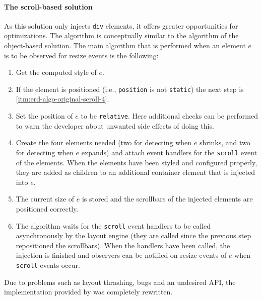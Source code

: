 \documentclass[a4paper,11pt]{kth-mag}
\newcommand{\code}[1]{\texttt{#1}}
\begin{document}
        \paragraph{The scroll-based solution}
        As this solution only injects \code{div} \glspl{element}, it offers greater opportunities for optimizations.
        The algorithm is conceptually similar to the algorithm of the object-based solution.
        The main algorithm that is performed when an element $e$ is to be observed for resize events is the following:
        \begin{enumerate}
          \item\label{itm:erd-algo-original-scroll-1} Get the computed style of $e$.
          \item\label{itm:erd-algo-original-scroll-2} If the element is positioned (i.e., \code{position} is not \code{static}) the next step is \ref{itm:erd-algo-original-scroll-4}.
          \item\label{itm:erd-algo-original-scroll-3} Set the position of $e$ to be \code{relative}. Here additional checks can be performed to warn the developer about unwanted side effects of doing this.
          \item\label{itm:erd-algo-original-scroll-4} Create the four \glspl{element} needed (two for detecting when $e$ shrinks, and two for detecting when $e$ expands) and attach event handlers for the \code{scroll} event of the \glspl{element}.
                                                      When the \glspl{element} have been styled and configured properly, they are added as children to an additional container element that is injected into $e$.
          \item\label{itm:erd-algo-original-scroll-5} The current size of $e$ is stored and the scrollbars of the injected \glspl{element} are positioned correctly.
          \item\label{itm:erd-algo-original-scroll-6} The algorithm waits for the \code{scroll} event handlers to be called asynchronously by the \gls{layout engine} (they are called since the previous step repositioned the scrollbars).
                                                      When the handlers have been called, the injection is finished and observers can be notified on resize events of $e$ when \code{scroll} events occur.
        \end{enumerate}
        Due to problems such as \gls{layout thrashing}, bugs and an undesired \gls{API}, the implementation provided by \cite{eq_imp_css-element-queries} was completely rewritten.
\end{document}

